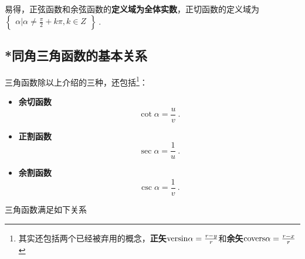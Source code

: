 易得，正弦函数和余弦函数的\textbf{定义域为全体实数}，正切函数的定义域为 $\begin{Bmatrix}\alpha|\alpha \neq \frac{\pi}{2}+k\pi,k\in Z\end{Bmatrix}~.$

\subsection{*同角三角函数的基本关系}
三角函数除以上介绍的三种，还包括\footnote{其实还包括两个已经被弃用的概念，\textbf{正矢}$\mathrm{versin }\alpha={r-y\over r}$和\textbf{余矢}$\mathrm{covers }\alpha={r-x\over r}$}：
\begin{definition}{}
\begin{itemize}
\item \textbf{余切函数}
\begin{equation}
\displaystyle\cot \alpha = \frac{u}{v}~.
\end{equation}
\item \textbf{正割函数}
\begin{equation}
\displaystyle\sec \alpha = \frac{1}{u}~.
\end{equation}
\item \textbf{余割函数}
\begin{equation}
\displaystyle\csc \alpha = \frac{1}{v}~.
\end{equation}
\end{itemize}
\end{definition}
三角函数满足如下关系
